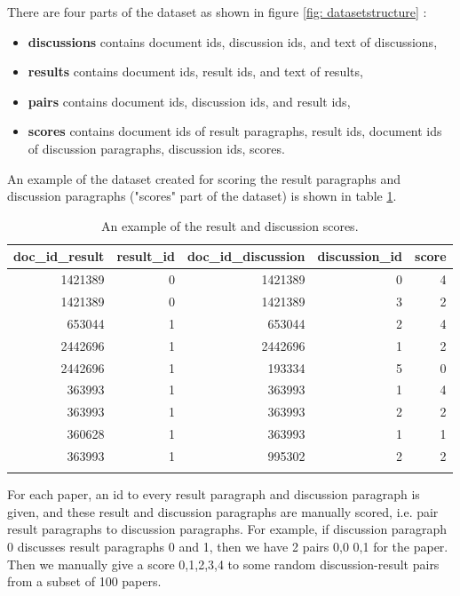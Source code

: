 \documentclass[10pt,a4paper,fleqn]{report}
\begin{document}
	There are four parts of the dataset as shown in figure \ref{fig: datasetstructure} : 
	\begin{itemize}
		\item \textbf{discussions} contains document ids, discussion ids, and text of discussions,
		\item \textbf{results} contains document ids, result ids, and text of results, 
		\item \textbf{pairs}  contains document ids, discussion ids, and result ids, 
		\item \textbf{scores}  contains document ids of result paragraphs, result ids, document ids of discussion paragraphs, discussion ids, scores.			
	\end{itemize}				
	
	An example of the dataset created for scoring the result paragraphs and discussion paragraphs ("scores" part of the dataset) is shown in table \ref{tab: result_discussion_score}.
	
	\begin{table}[htbp]
		\centering
		\begin{tabular}{rrrrr}
			\toprule
			\multicolumn{1}{l}{doc\_id\_result} & \multicolumn{1}{l}{result\_id} & \multicolumn{1}{l}{doc\_id\_discussion} & \multicolumn{1}{l}{discussion\_id} & \multicolumn{1}{l}{score} \\
			\midrule
			1421389 & 0     & 1421389 & 0     & 4 \\
			1421389 & 0     & 1421389 & 3     & 2 \\
			653044 & 1     & 653044 & 2     & 4 \\
			2442696 & 1     & 2442696 & 1     & 2 \\
			2442696 & 1     & 193334 & 5     & 0 \\
			363993 & 1     & 363993 & 1     & 4 \\
			363993 & 1     & 363993 & 2     & 2 \\
			360628 & 1     & 363993 & 1     & 1 \\
			363993 & 1     & 995302 & 2     & 2 \\
			\midrule
			&       &       &       &  \\
		\end{tabular}%
		\caption{An example of the result and discussion scores.}
		\label{tab: result_discussion_score}%
	\end{table}%
	
	For each paper, an id to every result paragraph and discussion paragraph is given, and these result and discussion paragraphs are manually scored, i.e. pair result paragraphs to discussion paragraphs. 
	For example, if discussion paragraph 0 discusses result paragraphs 0 and 1, then we have 2 pairs {0,0} {0,1} for the paper. 
	Then we manually give a score {0,1,2,3,4} to some random discussion-result pairs from a subset of 100 papers. 
	
\end{document}
